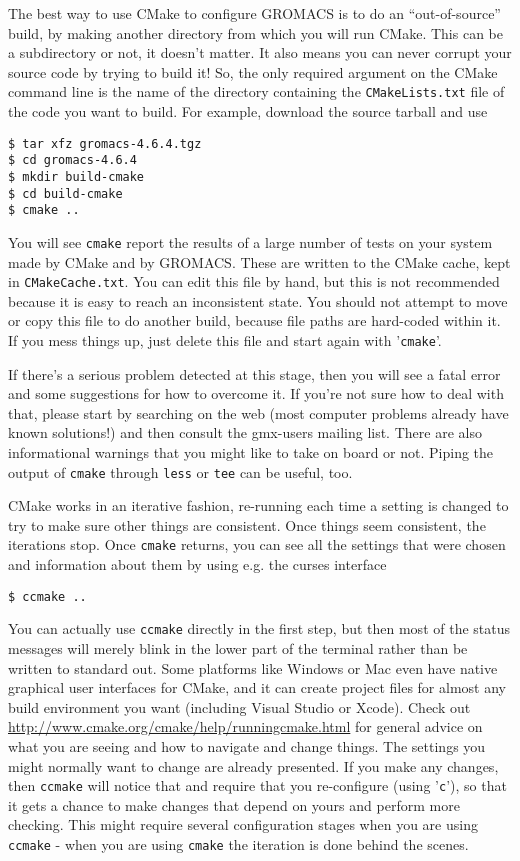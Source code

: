 \documentclass{article}[12pt,a4paper,twoside]
\newcommand{\gromacs}{GROMACS}
\newcommand{\cmake}{CMake}
\begin{document}
The best way to use \cmake{} to configure \gromacs{} is to do an
``out-of-source'' build, by making another directory from which you
will run \cmake{}. This can be a subdirectory or not, it doesn't
matter. It also means you can never corrupt your source code by trying
to build it! So, the only required argument on the \cmake{} command
line is the name of the directory containing the
\verb+CMakeLists.txt+ file of the code you want to build. For
example, download the source tarball and use
\begin{verbatim}
$ tar xfz gromacs-4.6.4.tgz
$ cd gromacs-4.6.4
$ mkdir build-cmake
$ cd build-cmake
$ cmake ..
\end{verbatim}

You will see \verb+cmake+ report the results of a large number of
tests on your system made by \cmake{} and by \gromacs{}. These are
written to the \cmake{} cache, kept in \verb+CMakeCache.txt+. You
can edit this file by hand, but this is not recommended because it is
easy to reach an inconsistent state. You should not attempt to move or
copy this file to do another build, because file paths are hard-coded
within it. If you mess things up, just delete this file and start
again with '\verb+cmake+'.

If there's a serious problem detected at this stage, then you will see
a fatal error and some suggestions for how to overcome it. If you're
not sure how to deal with that, please start by searching on the web
(most computer problems already have known solutions!) and then
consult the gmx-users mailing list. There are also informational
warnings that you might like to take on board or not. Piping the
output of \verb+cmake+ through \verb+less+ or \verb+tee+ can be
useful, too.

\cmake{} works in an iterative fashion, re-running each time a setting
is changed to try to make sure other things are consistent. Once
things seem consistent, the iterations stop. Once \verb+cmake+
returns, you can see all the settings that were chosen and information
about them by using e.g. the curses interface
\begin{verbatim}
$ ccmake ..
\end{verbatim}
You can actually use \verb+ccmake+ directly in the first step, but then
most of the status messages will merely blink in the lower part
of the terminal rather than be written to standard out. Some platforms
like Windows or Mac even have native graphical user interfaces for
\cmake{}, and it can create project files for almost any build environment
you want (including Visual Studio or Xcode).
Check out \url{http://www.cmake.org/cmake/help/runningcmake.html} for
general advice on what you are seeing and how to navigate and change
things. The settings you might normally want to change are already
presented. If you make any changes, then \verb+ccmake+ will notice
that and require that you re-configure (using '\verb+c+'), so that it
gets a chance to make changes that depend on yours and perform more
checking. This might require several configuration stages when you are
using \verb+ccmake+ - when you are using \verb+cmake+ the
iteration is done behind the scenes.
\end{document}
